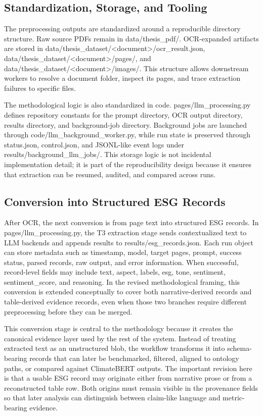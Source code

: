 \documentclass[english, online, cse, master]{dithesis}
\begin{document}
\subsection{Standardization, Storage, and Tooling}

The preprocessing outputs are standardized around a reproducible directory structure. Raw source PDFs remain in data/thesis\_pdf/. OCR-expanded artifacts are stored in data/thesis\_dataset/<document>/ocr\_result.json, data/thesis\_dataset/<document>/pages/, and data/thesis\_dataset/<document>/images/. This structure allows downstream workers to resolve a document folder, inspect its pages, and trace extraction failures to specific files.

The methodological logic is also standardized in code. pages/llm\_processing.py defines repository constants for the prompt directory, OCR output directory, results directory, and background-job directory. Background jobs are launched through code/llm\_background\_worker.py, while run state is preserved through status.json, control.json, and JSONL-like event logs under results/background\_llm\_jobs/. This storage logic is not incidental implementation detail; it is part of the reproducibility design because it ensures that extraction can be resumed, audited, and compared across runs.

\subsection{Conversion into Structured ESG Records}

After OCR, the next conversion is from page text into structured ESG records. In pages/llm\_processing.py, the T3 extraction stage sends contextualized text to LLM backends and appends results to results/esg\_records.json. Each run object can store metadata such as timestamp, model, target pages, prompt, success status, parsed records, raw output, and error information. When successful, record-level fields may include text, aspect, labels, esg, tone, sentiment, sentiment\_score, and reasoning. In the revised methodological framing, this conversion is extended conceptually to cover both narrative-derived records and table-derived evidence records, even when those two branches require different preprocessing before they can be merged.

This conversion stage is central to the methodology because it creates the canonical evidence layer used by the rest of the system. Instead of treating extracted text as an unstructured blob, the workflow transforms it into schema-bearing records that can later be benchmarked, filtered, aligned to ontology paths, or compared against ClimateBERT outputs. The important revision here is that a usable ESG record may originate either from narrative prose or from a reconstructed table row. Both origins must remain visible in the provenance fields so that later analysis can distinguish between claim-like language and metric-bearing evidence.
\end{document}
